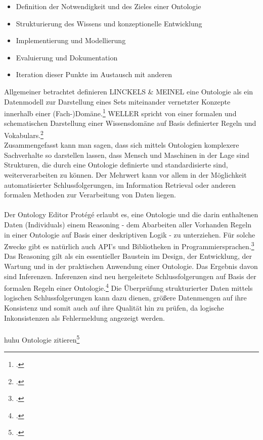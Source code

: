 \documentclass[12pt,a4paper]{article}
\begin{document}
\begin{itemize}
\item Definition der Notwendigkeit und des Zieles einer Ontologie
\item Strukturierung des Wissens und konzeptionelle Entwicklung
\item Implementierung und Modellierung
\item Evaluierung und Dokumentation
\item Iteration dieser Punkte im Austausch mit anderen
\end{itemize}
Allgemeiner betrachtet definieren LINCKELS \& MEINEL eine Ontologie als ein Datenmodell zur Darstellung eines Sets miteinander vernetzter Konzepte innerhalb einer (Fach-)Domäne.\footcite{linckels2011librarian}
WELLER spricht von einer formalen und schematischen Darstellung einer Wissensdomäne auf Basis definierter Regeln und Vokabulars.\footcite{weller2013InformationBand}
\\ 
Zusammengefasst kann man sagen, dass sich mittels Ontologien komplexere Sachverhalte so darstellen lassen, dass Mensch und Maschinen in der Lage sind Strukturen, die durch eine Ontologie definierte und standardisierte sind, weiterverarbeiten zu können. Der Mehrwert kann vor allem in der Möglichkeit automatisierter Schlussfolgerungen, im Information Retrieval oder anderen formalen Methoden zur Verarbeitung von Daten liegen.
\\
\\
Der Ontology Editor Protégé erlaubt es, eine Ontologie und die darin enthaltenen Daten (Individuals) einem Reasoning - dem Abarbeiten aller Vorhanden Regeln in einer Ontologie auf Basis einer deskriptiven Logik - zu unterziehen. Für solche Zwecke gibt es natürlich auch API's und Bibliotheken in Programmiersprachen.\footcite{musen2015protege} Das Reasoning gilt als ein essentieller Baustein im Design, der Entwicklung, der Wartung und in der praktischen Anwendung einer Ontologie. Das Ergebnis davon sind Inferenzen. Inferenzen sind neu hergeleitete Schlussfolgerungen auf Basis der formalen Regeln einer Ontologie.\footcite{dentler2011comparison} Die Überprüfung strukturierter Daten mittels logischen Schlussfolgerungen kann dazu dienen, größere Datenmengen auf ihre Konsistenz und somit auch auf ihre Qualität hin zu prüfen, da logische Inkonsistenzen als Fehlermeldung angezeigt werden.
\\
\\
huhu Ontologie zitieren\footcite[Vgl][S.162-178]{jannidis2017digital} 

\newpage
\end{document}
